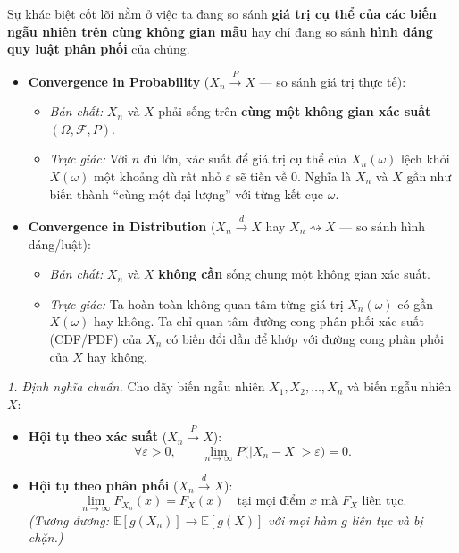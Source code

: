 Sự khác biệt cốt lõi nằm ở việc ta đang so sánh \textbf{giá trị cụ thể của các biến ngẫu nhiên trên cùng không gian mẫu} hay chỉ đang so sánh \textbf{hình dáng quy luật phân phối} của chúng.
\begin{itemize}
\item \textbf{Convergence in Probability} ($X_n\xrightarrow{P}X$ --- so sánh giá trị thực tế):
  \begin{itemize}
  \item \emph{Bản chất:} $X_n$ và $X$ phải sống trên \textbf{cùng một không gian xác suất} $(\Omega,\mathcal{F},P)$.
  \item \emph{Trực giác:} Với $n$ đủ lớn, xác suất để giá trị cụ thể của $X_n(\omega)$ lệch khỏi $X(\omega)$ một khoảng dù rất nhỏ $\varepsilon$ sẽ tiến về $0$. Nghĩa là $X_n$ và $X$ gần như biến thành ``cùng một đại lượng'' với từng kết cục $\omega$.
  \end{itemize}
\item \textbf{Convergence in Distribution} ($X_n\xrightarrow{d}X$ hay $X_n\rightsquigarrow X$ --- so sánh hình dáng/luật):
  \begin{itemize}
  \item \emph{Bản chất:} $X_n$ và $X$ \textbf{không cần} sống chung một không gian xác suất.
  \item \emph{Trực giác:} Ta hoàn toàn không quan tâm từng giá trị $X_n(\omega)$ có gần $X(\omega)$ hay không. Ta chỉ quan tâm đường cong phân phối xác suất (CDF/PDF) của $X_n$ có biến đổi dần để khớp với đường cong phân phối của $X$ hay không.
  \end{itemize}
\end{itemize}


\textit{1. Định nghĩa chuẩn.} Cho dãy biến ngẫu nhiên $X_1,X_2,\dots,X_n$ và biến ngẫu nhiên $X$:
\begin{itemize}
\item \textbf{Hội tụ theo xác suất} ($X_n\xrightarrow{P}X$):
\[ \forall \varepsilon>0,\qquad \lim_{n\to\infty}P\big(|X_n-X|>\varepsilon\big)=0. \]
\item \textbf{Hội tụ theo phân phối} ($X_n\xrightarrow{d}X$):
\[ \lim_{n\to\infty}F_{X_n}(x)=F_X(x)\quad\text{tại mọi điểm } x \text{ mà } F_X \text{ liên tục.} \]
\emph{(Tương đương: $\mathbb{E}[g(X_n)]\to\mathbb{E}[g(X)]$ với mọi hàm $g$ liên tục và bị chặn.)}
\end{itemize}

